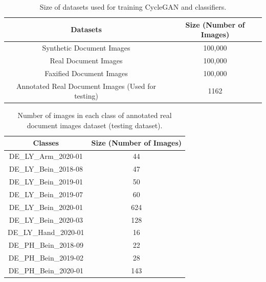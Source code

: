 \begin{center}
    \begin{table}[H]
    \begin{center}
    \begin{tabular}{||c c||} 
    \hline
    \textbf{Datasets} & \textbf{Size (Number of Images)}\\ [0.5ex] 
    \hline\hline
    Synthetic Document Images & 100,000 \\ 
    \hline
    Real Document Images & 100,000 \\
    \hline
    Faxified Document Images & 100,000 \\
    \hline
    Annotated Real Document Images (Used for testing) & 1162 \\
    \hline
    \end{tabular}
    \end{center}
    \caption{Size of datasets used for training \ac{CycleGAN} and classifiers.}
    \label{table:datasets}
    \end{table}
\end{center}



\begin{center}
    \begin{table}[H]
    \begin{center}
    \begin{tabular}{||c c||} 
    \hline
    \textbf{Classes} & \textbf{Size (Number of Images)}\\ [0.5ex] 
    \hline\hline
    DE\_LY\_Arm\_2020-01 & 44 \\ 
    \hline
    DE\_LY\_Bein\_2018-08 & 47 \\
    \hline
    DE\_LY\_Bein\_2019-01 & 50 \\
    \hline
    DE\_LY\_Bein\_2019-07&  60\\
    \hline
    DE\_LY\_Bein\_2020-01&  624\\
    \hline
    DE\_LY\_Bein\_2020-03&  128\\
    \hline
    DE\_LY\_Hand\_2020-01&  16\\
    \hline
    DE\_PH\_Bein\_2018-09&  22\\
    \hline
    DE\_PH\_Bein\_2019-02&  28\\
    \hline    
    DE\_PH\_Bein\_2020-01&  143\\
    \hline    
    \end{tabular}
    \end{center}
    \caption[Number of images in each class of annotated real document images dataset.]{Number of images in each class of annotated real document images dataset (testing dataset).}
    \label{table:testdataset}
    \end{table}
\end{center}


